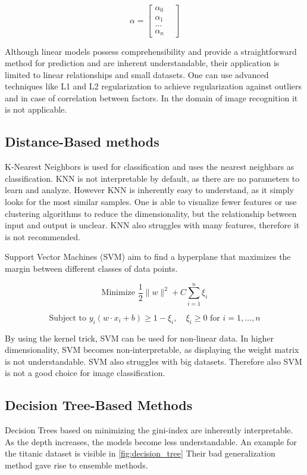 $$ \alpha = \begin{bmatrix}
	\alpha_0 & \\
	\alpha_1 & \\
	... & \\
	\alpha_n &
\end{bmatrix}
$$


Although linear models possess comprehensibility and provide a straightforward method for prediction and are inherent understandable, their application is limited to linear relationships and small datasets. One can use advanced techniques like L1 and L2 regularization \cite{jerome2010} to achieve regularization against outliers and in case of correlation between factors. In the domain of image recognition it is not applicable.

\subsection{Distance-Based methods}
K-Nearest Neighbors is used for classification and uses the nearest neighbars as classification. KNN is not interpretable by default, as there are no parameters to learn and analyze. However KNN is inherently easy to understand, as it simply looks for the most similar samples. One is able to visualize fewer features or use clustering algorithms to reduce the dimensionality, but the relationship between input and output is unclear. KNN also struggles with many features, therefore it is not recommended.

Support Vector Machines (SVM) aim to find a hyperplane that maximizes the margin between different classes of data points.

$$\text{Minimize } \frac{1}{2} \|w\|^2 + C \sum_{i=1}^{n} \xi_i$$

$$\text{Subject to } y_i (w \cdot x_i + b) \geq 1 - \xi_i, \quad \xi_i \geq 0 \text{ for } i = 1, \ldots, n$$

By using the kernel trick, SVM can be used for non-linear data. In higher dimensionality, SVM becomes non-interpretable, as displaying the weight matrix is not understandable. SVM also struggles with big datasets. Therefore also SVM is not a good choice for image classification.


\subsection{Decision Tree-Based Methods}

Decision Trees based on minimizing the gini-index are inherently interpretable. As the depth increases, the models become less understandable. An example for the titanic dataset is visible in \ref{fig:decision_tree} Their bad generalization method gave rise to ensemble methods.

